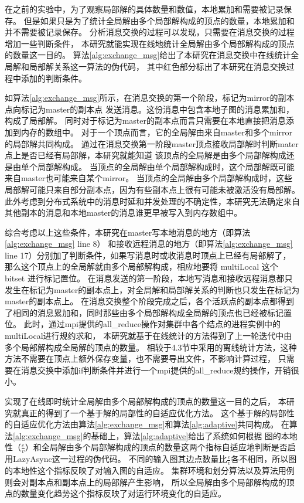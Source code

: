 在之前的实验中，为了观察局部解的具体数量和数值，本地累加和需要被记录保存。
但是如果只是为了统计全局解由多个局部解构成的顶点的数量，本地累加和并不需要被记录保存。
分析消息交换的过程可以发现，只需要在消息交换的过程增加一些判断条件，
本研究就能实现在线地统计全局解由多个局部解构成的顶点的数量这一目的。
算法\ref{alg:exchange_msg}给出了本研究在消息交换中在线统计全局解和局部解关系这一算法的伪代码，
其中红色部分标出了本研究在消息交换过程中添加的判断条件。

如算法\ref{alg:exchange_msg}所示，在消息交换的第一个阶段，标记为mirror的副本点向标记为master的副本点
发送消息。这份消息中包含本地子图的消息累加和，构成了局部解。
同时对于标记为master的副本点而言只需要在本地直接把消息添加到内存的数组中。
对于一个顶点而言，它的全局解由来自master和多个mirror的局部解共同构成。
通过在消息交换第一阶段master顶点接收局部解时判断mater点上是否已经有局部解，本研究就能知道
该顶点的全局解是由多个局部解构成还是由单个局部解构成。
当顶点的全局解由单个局部解构成时，这个局部解既可能来自master也可能来自某个mirror。
当顶点的全局解由多个局部解构成时，这些局部解可能只来自部分副本点，因为有些副本点上很有可能未被激活没有局部解。
此外考虑到分布式系统中的消息时延和并发处理的不确定性，本研究无法确定来自其他副本的消息和本地master的消息谁更早被写入到内存数组中。

综合考虑以上这些条件，本研究在master写本地消息的地方（即算法\ref{alg:exchange_msg} line 8）
和接收远程消息的地方（即算法\ref{alg:exchange_msg} line 17）分别加了判断条件，如果写消息时或收消息时顶点上已经有局部解了，
那么这个顶点上的全局解就由多个局部解构成，相应地要将 multiLocal 这个 bitset 进行标记置位。
在消息发送的第一阶段，本地写消息和接收远程消息都只发生在标记为master的副本点上，对全局解和局部解关系的判断也只发生在标记为master的副本点上。
在消息交换整个阶段完成之后，各个活跃点的副本点都得到了相同的消息累加和，同时那些由多个局部解构成全局解的顶点也已经被标记置位。
此时，通过mpi提供的all\_reduce操作对集群中各个结点的进程实例中的multiLocal进行规约求和，
本研究就基于在线统计的方法得到了上一轮迭代中由多个局部解构成全局解的顶点的数量。
相较于4.3节中采用的离线统计方法，这种方法不需要在顶点上额外保存变量，也不需要导出文件，不影响计算过程，
只需要在消息交换中添加if判断条件并进行一个mpi提供的all\_reduce规约操作，开销很小。



实现了在线即时统计全局解由多个局部解构成的顶点的数量这一目的之后，
本研究就真正的得到了一个基于解的局部性的自适应优化方法。
这个基于解的局部性的自适应优化方法由算法\ref{alg:exchange_msg}和算法\ref{alg:adaptive}共同构成。
在算法\ref{alg:exchange_msg}的基础上，算法\ref{alg:adaptive}给出了系统如何根据
图的本地性（$\frac{e}{v}$）和全局解由多个局部解构成的顶点的数量这两个指标自适应地判断是否启用LazyAsync这一过程的伪代码。
不同的输入图其边点数量比$\frac{e}{v}$各不相同，所以图的本地性这个指标反映了对输入图的自适应。
集群环境和划分算法以及算法用例则会对副本点和副本点上的局部解产生影响，
所以全局解由多个局部解构成的顶点的数量变化趋势这个指标反映了对运行环境变化的自适应。

